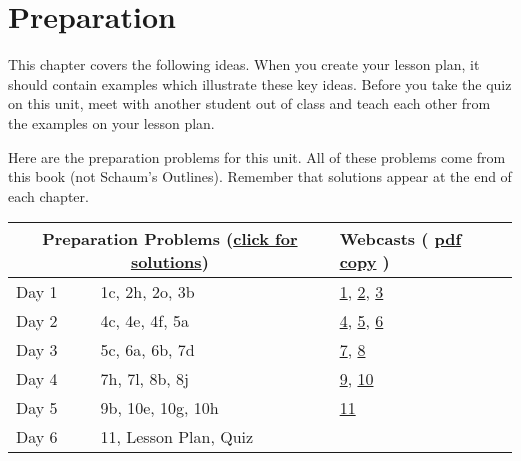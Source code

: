 \section{Preparation}

This chapter covers the following ideas. When you create your lesson plan, it should contain examples which illustrate these key ideas. Before you take the quiz on this unit, meet with another student out of class and teach each other from the examples on your lesson plan. 



Here are the preparation problems for this unit.  All of these problems come from this book (not Schaum's Outlines).  Remember that solutions appear at the end of each chapter.



\begin{center}
\begin{tabular}{ll|l}
\multicolumn{2}{c}{Preparation Problems (\href{http://ilearn.byui.edu/bbcswebdav/institution/Physical\_Sci\_Eng/Mathematics/Personal\%20Folders/WoodruffB/341/1-Arithmetic-Preparation-Solutions.pdf}{click for solutions})}
&
Webcasts 
(
\href{http://ilearn.byui.edu/bbcswebdav/institution/Physical\_Sci\_Eng/Mathematics/Personal\%20Folders/WoodruffB/341/1-Arithmetic-videos.pdf}{pdf copy}
)\\
\hline\hline
Day 1&
1c,
2h,
2o,
3b
&
\href{http://www.youtube.com/watch?v=FEsifMtAM7E}{1},
\href{http://www.youtube.com/watch?v=6ZHsC4B5sOU}{2},
\href{http://www.youtube.com/watch?v=QHxIJaV6m64}{3}
\\ \hline
Day 2&
4c,
4e,
4f,
5a
&
\href{http://www.youtube.com/watch?v=Di1Gr1jVMMk}{4},
\href{http://www.youtube.com/watch?v=9_lAevTRNTg}{5},
\href{http://www.youtube.com/watch?v=tFYE062AVBk}{6}
\\ \hline
Day 3&
5c,
6a,
6b,
7d
&
\href{http://www.youtube.com/watch?v=89QO4t1S-cA}{7},
\href{http://www.youtube.com/watch?v=DiULKK1CzR0}{8}
\\ \hline
Day 4&
7h,
7l,
8b,
8j 
&
\href{http://www.youtube.com/watch?v=7BhA5sZhx70}{9},
\href{http://www.youtube.com/watch?v=LEi1ftDDZLk}{10}
\\ \hline
Day 5&
9b,
10e,
10g,
10h
&
\href{http://www.youtube.com/watch?v=FZzgppjq6hY}{11}
\\ \hline
Day 6&
11, 
Lesson Plan,
Quiz &
\\ \hline
\end{tabular}
\end{center}

